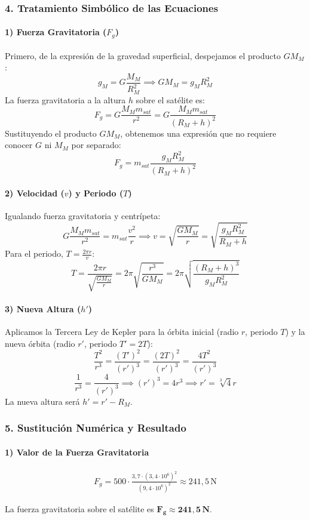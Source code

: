 \subsubsection*{4. Tratamiento Simbólico de las Ecuaciones}
\paragraph*{1) Fuerza Gravitatoria ($F_g$)}
Primero, de la expresión de la gravedad superficial, despejamos el producto $G M_M$:
$$g_M = G \frac{M_M}{R_M^2} \implies G M_M = g_M R_M^2$$
La fuerza gravitatoria a la altura $h$ sobre el satélite es:
$$F_g = G \frac{M_M m_{sat}}{r^2} = G \frac{M_M m_{sat}}{(R_M+h)^2}$$
Sustituyendo el producto $G M_M$, obtenemos una expresión que no requiere conocer $G$ ni $M_M$ por separado:
$$F_g = m_{sat} \frac{g_M R_M^2}{(R_M+h)^2}$$

\paragraph*{2) Velocidad ($v$) y Periodo ($T$)}
Igualando fuerza gravitatoria y centrípeta:
$$G \frac{M_M m_{sat}}{r^2} = m_{sat}\frac{v^2}{r} \implies v = \sqrt{\frac{G M_M}{r}} = \sqrt{\frac{g_M R_M^2}{R_M+h}}$$
Para el periodo, $T = \frac{2\pi r}{v}$:
$$T = \frac{2\pi r}{\sqrt{\frac{G M_M}{r}}} = 2\pi \sqrt{\frac{r^3}{G M_M}} = 2\pi \sqrt{\frac{(R_M+h)^3}{g_M R_M^2}}$$

\paragraph*{3) Nueva Altura ($h'$)}
Aplicamos la Tercera Ley de Kepler para la órbita inicial (radio $r$, periodo $T$) y la nueva órbita (radio $r'$, periodo $T' = 2T$):
$$\frac{T^2}{r^3} = \frac{(T')^2}{(r')^3} = \frac{(2T)^2}{(r')^3} = \frac{4T^2}{(r')^3}$$
$$\frac{1}{r^3} = \frac{4}{(r')^3} \implies (r')^3 = 4 r^3 \implies r' = \sqrt[3]{4} r$$
La nueva altura será $h' = r' - R_M$.

\subsubsection*{5. Sustitución Numérica y Resultado}
\paragraph*{1) Valor de la Fuerza Gravitatoria}
\begin{gather}
    F_g = 500 \cdot \frac{3,7 \cdot (3,4 \cdot 10^6)^2}{(9,4 \cdot 10^6)^2} \approx 241,5 \, \text{N}
\end{gather}
\begin{cajaresultado}
    La fuerza gravitatoria sobre el satélite es $\boldsymbol{F_g \approx 241,5 \, \textbf{N}}$.
\end{cajaresultado}

